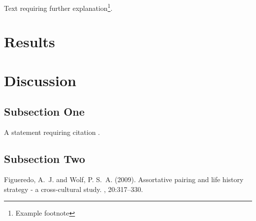 \documentclass[twoside,twocolumn]{article}
\begin{document}
Text requiring further explanation\footnote{Example footnote}.


\section{Results}


\section{Discussion}

\subsection{Subsection One}

A statement requiring citation \cite{Figueredo:2009dg}.

\subsection{Subsection Two}


\begin{thebibliography}{99} %

Figueredo, A.~J. and Wolf, P. S.~A. (2009).
\newblock Assortative pairing and life history strategy - a cross-cultural
  study.
, 20:317--330.
 
\end{thebibliography}

\end{document}
